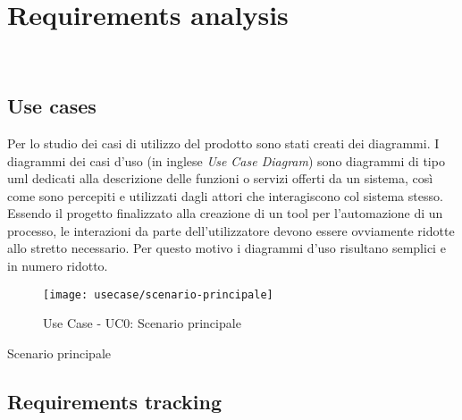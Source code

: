 
\chapter{Requirements analysis}
\label{cap:analisi-requisiti}

\\

\section{Use cases}

Per lo studio dei casi di utilizzo del prodotto sono stati creati dei diagrammi.
I diagrammi dei casi d'uso (in inglese \emph{Use Case Diagram}) sono diagrammi di tipo \gls{uml} dedicati alla descrizione delle funzioni o servizi offerti da un sistema, così come sono percepiti e utilizzati dagli attori che interagiscono col sistema stesso.
Essendo il progetto finalizzato alla creazione di un tool per l'automazione di un processo, le interazioni da parte dell'utilizzatore devono essere ovviamente ridotte allo stretto necessario. Per questo motivo i diagrammi d'uso risultano semplici e in numero ridotto.

\begin{figure}[!h] 
    \centering 
    \texttt{[image: usecase/scenario-principale]} 
    \caption{Use Case - UC0: Scenario principale}
\end{figure}

\begin{usecase}{0}{Scenario principale}
\label{uc:scenario-principale}
\end{usecase}

\section{Requirements tracking}


